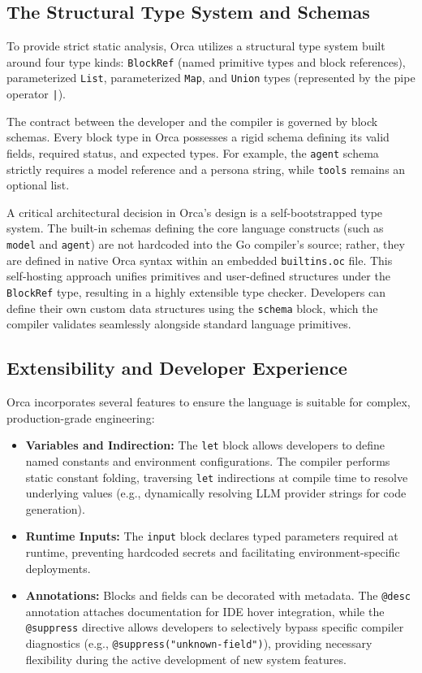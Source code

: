 \documentclass[sigconf,nonacm]{acmart}
\begin{document}
\subsection{The Structural Type System and Schemas}
\label{sec:design:types}

To provide strict static analysis, Orca utilizes a structural type system
built around four type kinds: \texttt{BlockRef} (named primitive types and
block references), parameterized \texttt{List}, parameterized \texttt{Map},
and \texttt{Union} types (represented by the pipe operator \texttt{|}).

The contract between the developer and the compiler is governed by block
schemas. Every block type in Orca possesses a rigid schema defining its
valid fields, required status, and expected types. For example, the
\texttt{agent} schema strictly requires a model reference and a persona
string, while \texttt{tools} remains an optional list.

A critical architectural decision in Orca's design is a self-bootstrapped
type system. The built-in schemas defining the core language constructs
(such as \texttt{model} and \texttt{agent}) are not hardcoded into the Go
compiler's source; rather, they are defined in native Orca syntax within an
embedded \texttt{builtins.oc} file. This self-hosting approach unifies
primitives and user-defined structures under the \texttt{BlockRef} type,
resulting in a highly extensible type checker. Developers can define their
own custom data structures using the \texttt{schema} block, which the
compiler validates seamlessly alongside standard language primitives.

\subsection{Extensibility and Developer Experience}
\label{sec:design:dx}

Orca incorporates several features to ensure the language is suitable for
complex, production-grade engineering:
\begin{itemize}[leftmargin=*]
  \item \textbf{Variables and Indirection:} The \texttt{let} block allows
        developers to define named constants and environment configurations.
        The compiler performs static constant folding, traversing \texttt{let}
        indirections at compile time to resolve underlying values (e.g.,
        dynamically resolving LLM provider strings for code generation).
  \item \textbf{Runtime Inputs:} The \texttt{input} block declares typed
        parameters required at runtime, preventing hardcoded secrets and
        facilitating environment-specific deployments.
  \item \textbf{Annotations:} Blocks and fields can be decorated with
        metadata. The \texttt{@desc} annotation attaches documentation for IDE
        hover integration, while the \texttt{@suppress} directive allows
        developers to selectively bypass specific compiler diagnostics (e.g.,
        \texttt{@suppress("unknown-field")}), providing necessary flexibility
        during the active development of new system features.
\end{itemize}
\end{document}
